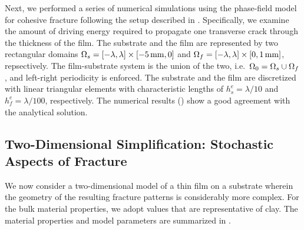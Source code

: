 Next, we performed a series of numerical simulations using the phase-field model for cohesive fracture following the setup described in .  Specifically, we examine the amount of driving energy required to propagate one transverse crack through the thickness of the film. The substrate and the film are represented by two rectangular domains $\Omega_s = [-\lambda,\lambda] \times [\SI{-5}{\milli\meter},0]$
and $\Omega_f = [-\lambda,\lambda] \times [0,\SI{1}{\milli\meter}]$, repsectively. The film-substrate system is the union of the two, i.e.\ $\Omega_0 = \Omega_s \cup \Omega_f$, and left-right periodicity is enforced. The substrate and the film are discretized with linear triangular elements with characteristic lengths of $h^e_s = \lambda/10$ and $h^e_f = \lambda/100$, respectively.
The numerical results () show a good agreement with the analytical solution.

\subsection{Two-Dimensional Simplification: Stochastic Aspects of Fracture}
\label{section: Chapter4/examples/2D}

We now consider a two-dimensional model of a thin film on a substrate wherein the geometry of the resulting fracture patterns is considerably more complex.  For the bulk material properties, we adopt values that are representative of clay. The material properties and model parameters are summarized in .

